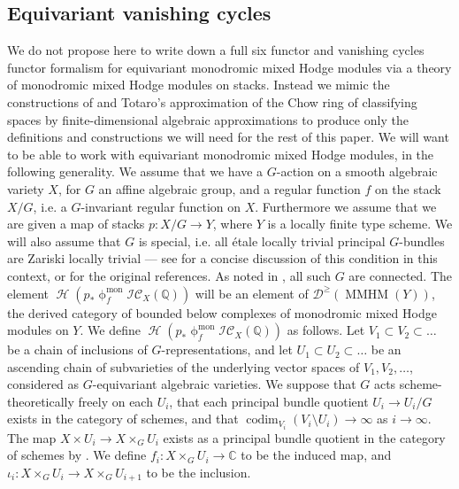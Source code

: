 \documentclass[a4paper,10pt]{amsart}
\renewcommand{\phi}{\upphi}
\newcommand{\ICS}{\mathcal{IC}}
\newcommand{\phim}[1]{\phi^{\mon}_{#1}}
\DeclareMathOperator{\mon}{mon}
\DeclareMathOperator{\MMHM}{MMHM}
\DeclareMathOperator{\codim}{codim}
\DeclareMathOperator{\Ho}{\mathcal{H}}
\newcommand{\Du}{\mathcal{D}^{\geq}}
\begin{document}
\subsection{Equivariant vanishing cycles}
\label{TotCon}
We do not propose here to write down a full six functor and vanishing cycles functor formalism for equivariant monodromic mixed Hodge modules via a theory of monodromic mixed Hodge modules on stacks.  Instead we mimic the constructions of \cite{BL94} and Totaro's approximation \cite{To99} of the Chow ring of classifying spaces by finite-dimensional algebraic approximations  to produce only the definitions and constructions we will need for the rest of this paper.
\smallbreak
We will want to be able to work with equivariant monodromic mixed Hodge modules, in the following generality.  We assume that we have a $G$-action on a smooth algebraic variety $X$, for $G$ an affine algebraic group, and a regular function $f$ on the stack $X/G$, i.e. a $G$-invariant regular function on $X$.  Furthermore we assume that we are given a map of stacks $p\colon X/G\rightarrow Y$, where $Y$ is a locally finite type scheme.  We will also assume that $G$ is special, i.e. all \'etale locally trivial principal $G$-bundles are Zariski locally trivial --- see \cite[Def.2.1]{JoyceMF} for a concise discussion of this condition in this context, or \cite{Chev58} for the original references.  As noted in \cite{JoyceMF}, all such $G$ are connected.
\smallbreak
The element $\Ho\left(p_*\phim{f}\ICS_X(\mathbb{Q})\right)$ will be an element of $\Du(\MMHM(Y))$, the derived category of bounded below complexes of monodromic mixed Hodge modules on $Y$.  
\smallbreak
We define $\Ho\left(p_*\phim{f}\ICS_X(\mathbb{Q})\right)$ as follows.  Let $V_1\subset V_2\subset\ldots$ be a chain of inclusions of $G$-representations, and let $U_1\subset U_2\subset\ldots$ be an ascending chain of subvarieties of the underlying vector spaces of $V_1,V_2,\ldots$, considered as $G$-equivariant algebraic varieties.  We suppose that $G$ acts scheme-theoretically freely on each $U_i$, that each principal bundle quotient $U_i\rightarrow U_i/G$ exists in the category of schemes, and that $\codim_{V_i}(V_i\setminus U_i)\rightarrow \infty$ as $i\rightarrow\infty$.  The map $X\times U_i\rightarrow X\times_G U_i$ exists as a principal bundle quotient in the category of schemes by \cite[Prop.23]{EdGr98}.  We define $f_i\colon X\times_G U_i\rightarrow \mathbb{C}$ to be the induced map, and $\iota_i\colon X\times_G U_i\rightarrow X\times_G U_{i+1}$ to be the inclusion.
\end{document}
